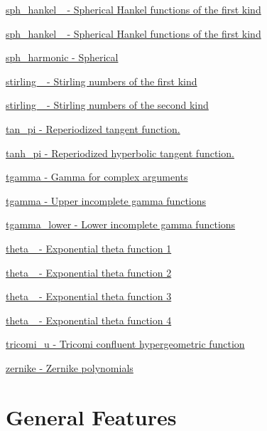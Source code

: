 \begin{DoxyItemize}
\item \hyperlink{group__gnu__math__spec__func_ga04c91059810f366e3366fadef9084be7}{sph\+\_\+hankel\+\_ -\/ Spherical Hankel functions of the first kind}
\item \hyperlink{group__gnu__math__spec__func_gafb5debe7f7db9e9e456c065acf738f64}{sph\+\_\+hankel\+\_ -\/ Spherical Hankel functions of the first kind}
\item \hyperlink{group__gnu__math__spec__func_gadca3d25c4f7eed15099d8f80681d4055}{sph\+\_\+harmonic -\/ Spherical}
\item \hyperlink{group__gnu__math__spec__func_ga2b955dac7d2c5125f2091eaeb25c8ad2}{stirling\+\_ -\/ Stirling numbers of the first kind}
\item \hyperlink{group__gnu__math__spec__func_ga3761c0e467cbe45cbda66a4e796adcd3}{stirling\+\_ -\/ Stirling numbers of the second kind}
\item \hyperlink{group__gnu__math__spec__func_ga5029c1e804c1c9b28949b5ef00237c08}{tan\+\_\+pi -\/ Reperiodized tangent function.}
\item \hyperlink{group__gnu__math__spec__func_ga5f0c92cb16210a8d087327ff2c048115}{tanh\+\_\+pi -\/ Reperiodized hyperbolic tangent function.}
\item \hyperlink{group__gnu__math__spec__func_gac76f330d5eed535fc5936b9625099fdf}{tgamma -\/ Gamma for complex arguments}
\item \hyperlink{group__gnu__math__spec__func_gac76f330d5eed535fc5936b9625099fdf}{tgamma -\/ Upper incomplete gamma functions}
\item \hyperlink{group__gnu__math__spec__func_ga973fba718e906a5179d954c56b991c8d}{tgamma\+\_\+lower -\/ Lower incomplete gamma functions}
\item \hyperlink{group__gnu__math__spec__func_gac122af3ffd2e5536fdf021afce79b7d4}{theta\+\_ -\/ Exponential theta function 1}
\item \hyperlink{group__gnu__math__spec__func_gacec36dc316e561bbaa371c60c06e52f7}{theta\+\_ -\/ Exponential theta function 2}
\item \hyperlink{group__gnu__math__spec__func_ga34e5d79e6ba8b8b104e690fc1ebc7fd6}{theta\+\_ -\/ Exponential theta function 3}
\item \hyperlink{group__gnu__math__spec__func_ga25e72f2b50b53d168f8fa653b1a0d012}{theta\+\_ -\/ Exponential theta function 4}
\item \hyperlink{group__gnu__math__spec__func_gaa1fda5b87a8c44debac679331bebfb11}{tricomi\+\_\+u -\/ Tricomi confluent hypergeometric function}
\item \hyperlink{group__gnu__math__spec__func_ga5df3bb50b78cd1bc676763dbf9e64929}{zernike -\/ Zernike polynomials}
\end{DoxyItemize}\hypertarget{index_general}{}\section{General Features}\label{index_general}
